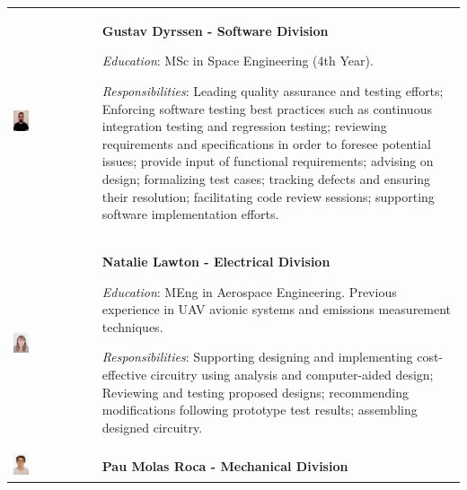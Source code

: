 \documentclass[a4paper,12pt,twoside]{article}
\begin{document}
\begin{longtable}[]{m{} m{}}
\includegraphics[width=0.2\textwidth]{1-introduction/img/gustav-dryssen.jpg} & \textbf{Gustav Dyrssen - Software Division}

\smallskip
\textit{Education}: MSc in Space Engineering (4th Year).

\smallskip
\textit{Responsibilities}: Leading quality assurance and testing efforts; Enforcing software testing best practices such as continuous integration testing and regression testing; reviewing requirements and specifications in order to foresee potential issues; provide input of functional requirements; advising on design; formalizing test cases; tracking defects and ensuring their resolution; facilitating code review sessions; supporting software implementation efforts.     
\bigskip
\\


\includegraphics[width=0.2\textwidth]{1-introduction/img/natalie-lawton.jpg} & \textbf{Natalie Lawton - Electrical Division}

\smallskip
\textit{Education}: MEng in Aerospace Engineering. Previous experience in UAV avionic systems and emissions measurement techniques.

\smallskip
\textit{Responsibilities}: Supporting designing and implementing cost-effective circuitry using analysis and computer-aided design; Reviewing and testing proposed designs; recommending modifications following prototype test results; assembling designed circuitry. 
\bigskip
\\

\includegraphics[width=0.2\textwidth]{1-introduction/img/pau-molas-roca.jpg} & \textbf{Pau Molas Roca - Mechanical Division}


\end{longtable}
\end{document}
